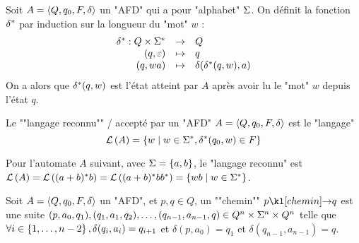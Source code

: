 \begin{definition}
	\AP
	Soit $A = \langle Q, q_0, F, \delta \rangle$ un "AFD" qui a pour "alphabet" $\Sigma$. On définit la fonction $\delta^{*}$ par induction sur la longueur du "mot" $w$ :
	$$ \begin{array}{rcl}
			\delta^{*} : Q \times \Sigma^{*} & \to     & Q                               \\
			(q, \varepsilon)                   & \mapsto & q                               \\
			(q, wa)                         & \mapsto & \delta(\delta^{*}(q, w), a)
		\end{array} $$
	On a alors que $\delta^{*}(q, w)$ est l'état atteint par $A$ après avoir lu le "mot" $w$ depuis l'état $q$.
\end{definition}

\begin{definition}
	\AP
	Le ""langage reconnu"" / accepté par un "AFD" $A = \langle Q, q_0, F, \delta \rangle$ est le "langage"
	$$ \mathcal{L}\left(A\right) = \left\{w \mid w \in \Sigma^{*}, \delta^{*}(q_0, w) \in F\right\} $$
\end{definition}

\begin{exemple}
	Pour l'automate $A$ suivant, avec $\Sigma = \left\{a,b\right\}$, le "langage reconnu" est
	$\mathcal{L}\left(A\right) = \mathcal{L}\left((a + b)^{*} b\right) = \mathcal{L}\left((a + b)^{*} b b^{*}\right) = \left\{wb \mid w \in \Sigma^{*}\right\}$.

	\begin{center}
		\begin{automata}
		\end{automata}
	\end{center}
\end{exemple}


\begin{definition}[chemin]
	\AP
	Soit $A = \langle Q, q_0, F, \delta \rangle$ un "AFD", et $p,q \in Q$, un ""chemin"" $p \cheminD q$ est une suite
	$(p, a_0, q_1), (q_1, a_1, q_2), \ldots, (q_{n-1}, a_{n-1}, q)  \in Q^n \times \Sigma^n \times Q^n$
	telle que
	$\forall i \in \left\{1,\ldots,n-2\right\}, \delta(q_i, a_i) = q_{i+1}$ et $\delta(p, a_0) = q_1$ et $\delta(q_{n-1}, a_{n-1}) = q$.
\end{definition}

